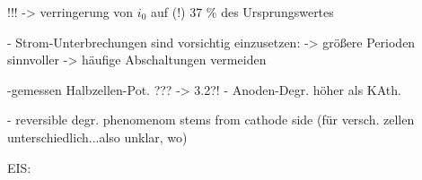 \documentclass[onecolumn,10pt,titlepage]{article}
\begin{document}
\cite{Rakousky2016}
!!! -> verringerung von $i_0$ auf (!) 37 \% des Ursprungswertes









- Strom-Unterbrechungen sind vorsichtig einzusetzen:
-> größere Perioden sinnvoller
-> häufige Abschaltungen vermeiden

-gemessen Halbzellen-Pot. ??? -> 3.2?!
- Anoden-Degr. höher als KAth.

- reversible degr. phenomenom stems from cathode side (für versch. zellen unterschiedlich...also unklar, wo)

EIS:
\end{document}
